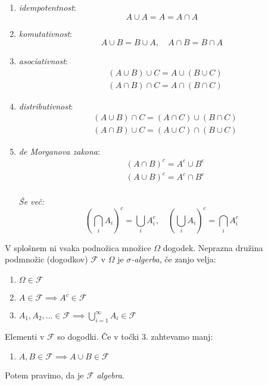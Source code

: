 \documentclass[12pt]{book}
\def\n{\noindent}
\def\s{\vspace{10pt}}
\theoremstyle{definition}
\theoremstyle{plain}
\theoremstyle{plain}
\theoremstyle{plain}
\theoremstyle{remark}
\begin{document}
\begin{enumerate}
    \item \emph{idempotentnost}: $$A \cup A=A=A \cap A$$
    \item \emph{komutativnost}: $$A \cup B=B \cup A, \quad A \cap B=B \cap A$$
    \item \emph{asociativnost}: $$\begin{aligned} & (A \cup B) \cup C=A \cup(B \cup C) \\ & (A \cap B) \cap C=A \cap(B \cap C)\end{aligned}$$
    \item \emph{distributivnost}: $$\begin{aligned} & (A \cup B) \cap C=(A \cap C) \cup(B \cap C) \\ & (A \cap B) \cup C=(A \cup C) \cap(B \cup C)\end{aligned}$$
    \item \emph{de Morganova zakona}: $$\begin{aligned} & (A \cap B)^c=A^c \cup B^c \\ & (A \cup B)^c=A^c \cap B^c\end{aligned}$$ \\ \emph{Še več:} $$ \left(\bigcap_i A_i\right)^c=\bigcup_i A_i^c, \quad \left(\bigcup_i A_i\right)^c=\bigcap_i A_i^c$$
\end{enumerate}

\n V splošnem ni vsaka podnožica množice $\Omega$ dogodek. Neprazna družina podmnožic (dogodkov) $\mathcal{F}$ v $\Omega$ je \emph{$\sigma$-algerba}, če zanjo velja: 

\begin{enumerate}
    \item $\Omega \in \mathcal{F}$
    \item $A \in \mathcal{F} \implies A^c \in \mathcal{F}$
    \item $A_1, A_2, \ldots \in \mathcal{F} \implies \bigcup_{i=1}^{\infty} A_i \in \mathcal{F}$
\end{enumerate}

\n Elementi v $\mathcal{F}$ so dogodki. Če v točki 3. zahtevamo manj: 

\begin{enumerate}[start=3,label={\arabic**.}]
    \item $A, B \in \mathcal{F} \implies A \cup B \in \mathcal{F}$
\end{enumerate}

Potem pravimo, da je $\mathcal{F}$ \emph{algebra}. \s
\end{document}
